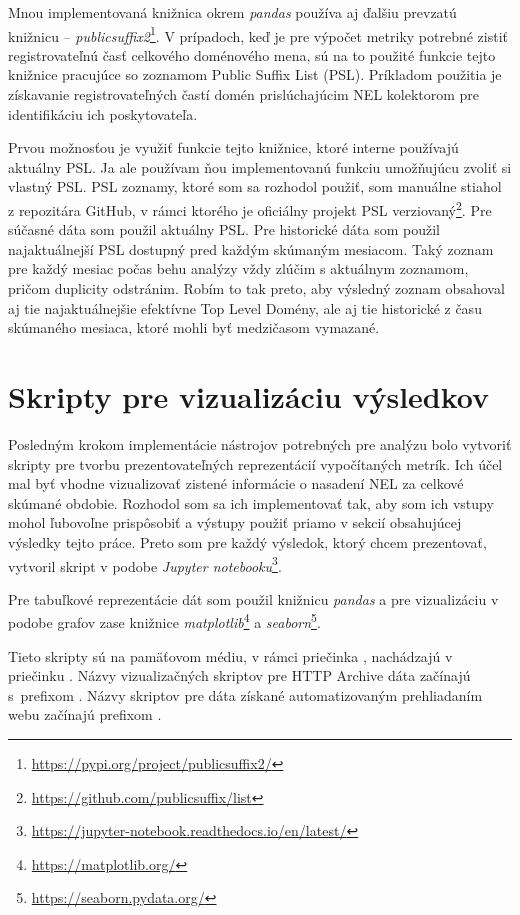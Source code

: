 Mnou implementovaná knižnica  okrem \textit{pandas} používa aj ďalšiu prevzatú knižnicu -- \textit{publicsuffix2}\footnote{\url{https://pypi.org/project/publicsuffix2/}}.
V prípadoch, keď je pre výpočet metriky potrebné zistiť registrovateľnú časť celkového doménového mena,
sú na to použité funkcie tejto knižnice pracujúce so zoznamom Public Suffix List (PSL). Príkladom použitia je získavanie registrovateľných častí domén prislúchajúcim NEL kolektorom pre identifikáciu ich poskytovateľa.

Prvou možnosťou je využiť funkcie tejto knižnice, ktoré interne používajú aktuálny PSL.
Ja ale používam ňou implementovanú funkciu umožňujúcu zvoliť si vlastný PSL.
PSL zoznamy, ktoré som sa rozhodol použiť, som manuálne stiahol z repozitára GitHub, v rámci ktorého je oficiálny projekt PSL verziovaný\footnote{\url{https://github.com/publicsuffix/list}}. 
Pre súčasné dáta som použil aktuálny PSL.
Pre historické dáta som použil najaktuálnejší PSL dostupný pred každým skúmaným mesiacom.
Taký zoznam pre každý mesiac počas behu analýzy vždy zlúčim s aktuálnym zoznamom, pričom duplicity odstránim.
Robím to tak preto, aby výsledný zoznam obsahoval aj tie najaktuálnejšie efektívne Top Level Domény, ale aj tie historické z času skúmaného mesiaca, ktoré mohli byť medzičasom vymazané.


\section{Skripty pre vizualizáciu výsledkov}
\label{visualize_results}

Posledným krokom implementácie nástrojov potrebných pre analýzu bolo vytvoriť skripty pre tvorbu prezentovateľných reprezentácií vypočítaných metrík.
Ich účel mal byť vhodne vizualizovať zistené informácie o nasadení NEL za celkové skúmané obdobie.
Rozhodol som sa ich implementovať tak, aby som ich vstupy mohol ľubovoľne prispôsobiť a výstupy použiť priamo v sekcií obsahujúcej výsledky tejto práce.
Preto som pre každý výsledok, ktorý chcem prezentovať, vytvoril skript v podobe \textit{Jupyter notebooku}\footnote{\url{https://jupyter-notebook.readthedocs.io/en/latest/}}.

Pre tabuľkové reprezentácie dát som použil knižnicu \textit{pandas} a pre vizualizáciu v podobe grafov zase knižnice \textit{matplotlib}\footnote{\url{https://matplotlib.org/}} a \textit{seaborn}\footnote{\url{https://seaborn.pydata.org/}}.

Tieto skripty sú na pamäťovom médiu, v rámci priečinka , nachádzajú v priečinku .
Názvy vizualizačných skriptov pre HTTP Archive dáta začínajú \mbox{s prefixom} .
Názvy skriptov pre dáta získané automatizovaným prehliadaním webu začínajú prefixom .

